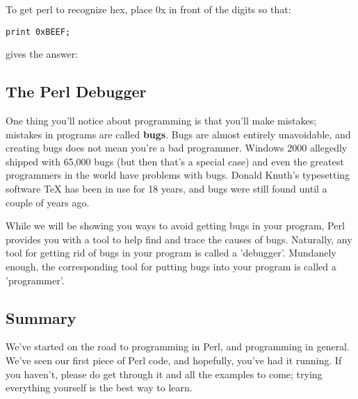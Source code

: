 \documentclass[a4paper,12pt,twoside]{book}
\begin{document}
\noindent 

\noindent To get perl to recognize hex, place 0x in front of the digits so that:

\noindent 

\noindent \texttt{print 0xBEEF;}

\noindent 

\noindent gives the answer:

\noindent 



\noindent 

\subsection{The Perl Debugger}

\noindent 

\noindent One thing you'll notice about programming is that you'll make mistakes; mistakes in programs are called \textbf{bugs}. Bugs are almost entirely unavoidable, and creating bugs does not mean you're a bad programmer. Windows 2000 allegedly shipped with 65,000 bugs (but then that's a special case) and even the greatest programmers in the world have problems with bugs. Donald Knuth's typesetting software TeX has been in use for 18 years, and bugs were still found until a couple of years ago.

\noindent 

\noindent While we will be showing you ways to avoid getting bugs in your program, Perl provides you with a tool to help find and trace the causes of bugs. Naturally, any tool for getting rid of bugs in your program is called a 'debugger'. Mundanely enough, the corresponding tool for putting bugs into your program is called a 'programmer'.

\noindent 

\noindent 

\subsection{Summary}

\noindent 

\noindent We've started on the road to programming in Perl, and programming in general. We've seen our first piece of Perl code, and hopefully, you've had it running. If you haven't, please do get through it and all the examples to come; trying everything yourself is the best way to learn.

\noindent 
\end{document}
